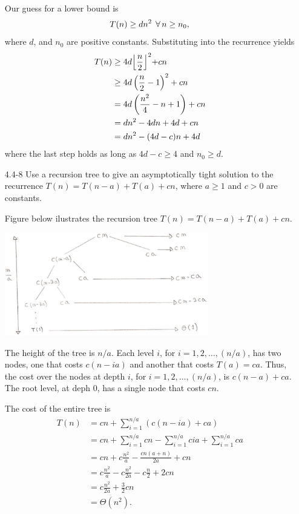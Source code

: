 \begin{enumerate}
\begin{framed}
Our guess for a lower bound is
\[
T(n) \ge dn^2 \; \operatorname{\forall} n \ge n_0,
\]
where $d$, and $n_0$ are positive constants. Substituting into the
recurrence yields
\begin{equation*}
\begin{aligned}
  T(n) &\ge 4d \Bigl\lfloor\frac{n}{2}\Bigl\rfloor^2 + cn\\
       &\ge 4d \left(\frac{n}{2} - 1\right)^2 + cn\\
       &=   4d \left( \frac{n^2}{4} - n + 1 \right) + cn\\
       &=   d n^2 - 4dn + 4d + cn\\
       &=   d n^2 - (4d - c)n + 4d
\end{aligned}
\end{equation*}
where the last step holds as long as $4d - c \ge 4$ and $n_0 \ge d$.
\end{framed}

\newpage

\item[4.4{-}8]{Use a recursion tree to give an asymptotically tight solution to
the recurrence $T(n) = T(n - a) + T(a) + cn$, where $a \ge 1$ and $c > 0$ are
constants.}

\begin{framed}
Figure below ilustrates the recursion tree $T(n) = T(n - a) + T(a) + cn$.

\begin{center}
\includegraphics[width=0.7\textwidth]{images/4_4_8_1.pdf}
\end{center}

The height of the tree is $n/a$. Each level $i$, for $i = 1, 2, \dots, (n/a)$,
has two nodes, one that costs $c(n - ia)$ and another that costs $T(a) = ca$.
Thus, the cost over the nodes at depth $i$, for $i = 1, 2, \dots, (n/a)$, is
$c(n - a) + ca$. The root level, at deph 0, has a single node that costs $cn$.

The cost of the entire tree is
\begin{equation*}
\begin{aligned}
  T(n) &= cn + \sum_{i = 1}^{n/a} (c (n - ia) + ca)\\
       &= cn + \sum_{i = 1}^{n/a} cn - \sum_{i = 1}^{n/a} cia + \sum_{i = 1}^{n/a} ca\\
       &= cn + c\frac{n^2}{a} - \frac{cn (a + n)}{2a} + cn\\
       &= c \frac{n^2}{a} - c\frac{n^2}{2a} - c \frac{n}{2} + 2cn\\
       &= c \frac{n^2}{2a} + \frac{3}{2} cn\\
       &= \Theta(n^2).
\end{aligned}
\end{equation*}


\end{framed}
\end{enumerate}
